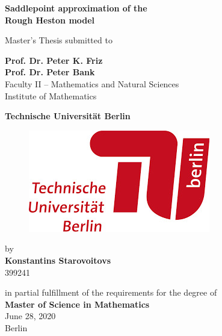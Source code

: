 \documentclass[12pt,twoside]{article}
\theoremstyle{plain}
\theoremstyle{plain}
\theoremstyle{definition}
\theoremstyle{remark}
\numberwithin{equation}{section}
\begin{document}

\begin{titlepage}

\begin{center}

    {\LARGE{\bf Saddlepoint approximation of the\\
    \vspace{7pt}
    Rough Heston model}} \vspace{0.5cm}


    {\normalsize Master's Thesis submitted to}\\\vspace{0.5cm}
    
    {\large{\bf Prof. Dr. Peter K. Friz}} \\
    \vspace{5pt}
    {\large{\bf Prof. Dr. Peter Bank}} \\\vspace{0.5cm}
    {\normalsize
    Faculty II – Mathematics and Natural Sciences  \\
    Institute of Mathematics} \vspace{0.5cm}
    
    
    {\normalsize{\bf Technische Universität Berlin}} \\\vspace{1.5cm}
    
    \begin{figure}[H] 
\begin{center}
\includegraphics[scale=0.3]{TU.png}
\label{fig:tu_logo}
\end{center}
\end{figure}
    
    


    {\normalsize by \\\vspace{0.5cm}
    {\Large{\bf Konstantins Starovoitovs}} \\ \vspace{5pt}
    399241} \vspace{1cm}


    {\normalsize in partial fulfillment of the requirements
    for the degree of \\
    {\bf Master of Science in Mathematics} \\\vspace{1cm}
    June 28, 2020 \\\vspace{5pt}Berlin}

\end{center}

\end{titlepage}
\end{document}
